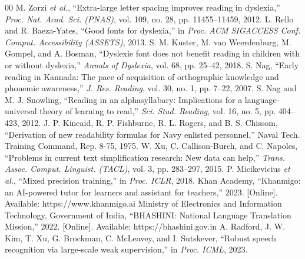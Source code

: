 \documentclass[conference]{IEEEtran}
\begin{document}
\begin{thebibliography}{00}
 M. Zorzi \textit{et al.}, ``Extra-large letter spacing improves reading in dyslexia,'' \textit{Proc. Nat. Acad. Sci. (PNAS)}, vol. 109, no. 28, pp. 11455--11459, 2012.
 L. Rello and R. Baeza-Yates, ``Good fonts for dyslexia,'' in \textit{Proc. ACM SIGACCESS Conf. Comput. Accessibility (ASSETS)}, 2013.
 S. M. Kuster, M. van Weerdenburg, M. Gompel, and A. Bosman, ``Dyslexie font does not benefit reading in children with or without dyslexia,'' \textit{Annals of Dyslexia}, vol. 68, pp. 25--42, 2018.
 S. Nag, ``Early reading in Kannada: The pace of acquisition of orthographic knowledge and phonemic awareness,'' \textit{J. Res. Reading}, vol. 30, no. 1, pp. 7--22, 2007.
 S. Nag and M. J. Snowling, ``Reading in an alphasyllabary: Implications for a language-universal theory of learning to read,'' \textit{Sci. Stud. Reading}, vol. 16, no. 5, pp. 404--423, 2012.
 J. P. Kincaid, R. P. Fishburne, R. L. Rogers, and B. S. Chissom, ``Derivation of new readability formulas for Navy enlisted personnel,'' Naval Tech. Training Command, Rep. 8-75, 1975.
 W. Xu, C. Callison-Burch, and C. Napoles, ``Problems in current text simplification research: New data can help,'' \textit{Trans. Assoc. Comput. Linguist. (TACL)}, vol. 3, pp. 283--297, 2015.
 P. Micikevicius \textit{et al.}, ``Mixed precision training,'' in \textit{Proc. ICLR}, 2018.
 Khan Academy, ``Khanmigo: an AI-powered tutor for learners and assistant for teachers,'' 2023. [Online]. Available: https://www.khanmigo.ai
 Ministry of Electronics and Information Technology, Government of India, ``BHASHINI: National Language Translation Mission,'' 2022. [Online]. Available: https://bhashini.gov.in
 A. Radford, J. W. Kim, T. Xu, G. Brockman, C. McLeavey, and I. Sutskever, ``Robust speech recognition via large-scale weak supervision,'' in \textit{Proc. ICML}, 2023.
\end{thebibliography}
\end{document}
